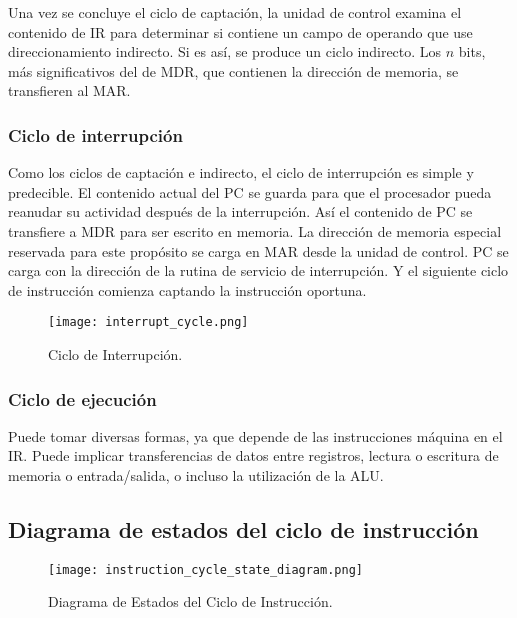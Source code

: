 \documentclass{article}
\begin{document}
Una vez se concluye el ciclo de captaci\'{o}n, la unidad de control examina el contenido
de IR para determinar si contiene un campo de operando que use direccionamiento indirecto.
Si es as\'{i}, se produce un ciclo indirecto. Los $n$ bits, m\'{a}s significativos del
de MDR, que contienen la direcci\'{o}n de memoria, se transfieren al MAR.

\subsubsection*{Ciclo de interrupci\'{o}n}
Como los ciclos de captaci\'{o}n e indirecto, el ciclo de interrupci\'{o}n es
simple y predecible. El contenido actual del PC se guarda para que el procesador
pueda reanudar su actividad despu\'{e}s de la interrupci\'{o}n. As\'{i} el contenido
de PC se transfiere a MDR para ser escrito en memoria. La direcci\'{o}n de memoria
especial reservada para este prop\'{o}sito se carga en MAR desde la unidad de control.
PC se carga con la direcci\'{o}n de la rutina de servicio de interrupci\'{o}n. Y el
siguiente ciclo de instrucci\'{o}n comienza captando la instrucci\'{o}n oportuna.

\begin{figure}[ht]
      \centering
      \texttt{[image: interrupt\_cycle.png]}
      \caption{Ciclo de Interrupci\'{o}n.
      \cite{stallings2006organización}}
      \label{fig:structure-and-function-cpu-7}
\end{figure}

\subsubsection*{Ciclo de ejecuci\'{o}n}
Puede tomar diversas formas, ya que depende de las instrucciones m\'{a}quina en el
IR. Puede implicar transferencias de datos entre registros, lectura o escritura de
memoria o entrada/salida, o incluso la utilizaci\'{o}n de la ALU.

\subsection*{Diagrama de estados del ciclo de instrucci\'{o}n}
\begin{figure}[ht]
      \centering
      \texttt{[image: instruction\_cycle\_state\_diagram.png]}
      \caption{Diagrama de Estados del Ciclo de Instrucci\'{o}n.
      \cite{stallings2006organización}}
      \label{fig:structure-and-function-cpu-8}
\end{figure}
\end{document}
